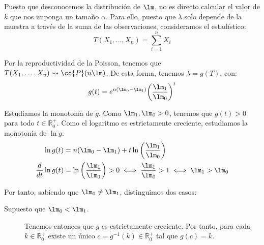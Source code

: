 \begin{ejercicio}
    Puesto que desconocemos la distribución de $\lm$, no es directo calcular el valor de $k$ que nos imponga un tamaño $\alpha$. Para ello, puesto que $\lambda$ solo depende de la muestra a través de la suma de las observaciones, consideramos el estadístico:
    \begin{equation*}
        T(X_1, \ldots, X_n) = \sum\limits_{i=1}^{n}X_i
    \end{equation*}

    Por la reproductividad de la Poisson, tenemos que $T(X_1, \ldots, X_n)\rightsquigarrow \cc{P}(n\lm)$. De esta forma, tenemos $\lambda=g(T)$, con:
    \begin{equation*}
        g(t) = e^{n(\lm_0-\lm_1)}{\left(\frac{\lm_1}{\lm_0}\right)}^{t}
    \end{equation*}

    Estudiamos la monotonía de $g$. Como $\lm_1,\lm_0>0$, tenemos que $g(t)>0$ para todo $t\in \mathbb{R}^+_0$. Como el logaritmo es estrictamente creciente, estudiamos la monotonía de $\ln g$:
    \begin{align*}
        \ln g(t) &= n(\lm_0-\lm_1) + t\ln\left(\frac{\lm_1}{\lm_0}\right) \\
        \frac{d}{dt}\ln g(t) &= \ln\left(\frac{\lm_1}{\lm_0}\right)>0\iff \frac{\lm_1}{\lm_0}>1 \iff \lm_1>\lm_0
    \end{align*}

    Por tanto, sabiendo que $\lm_0\neq \lm_1$, distinguimos dos casos:
    \begin{description}
        \item [Supuesto que $\lm_0<\lm_1$.] Tenemos entonces que $g$ es estrictamente creciente. Por tanto, para cada $k\in \mathbb{R}^+_0$ existe un único $c=g^{-1}(k)\in \mathbb{R}^+_0$ tal que $g(c)=k$.
            \begin{figure}[h]
                \centering
\end{figure}
\end{description}
\end{ejercicio}

